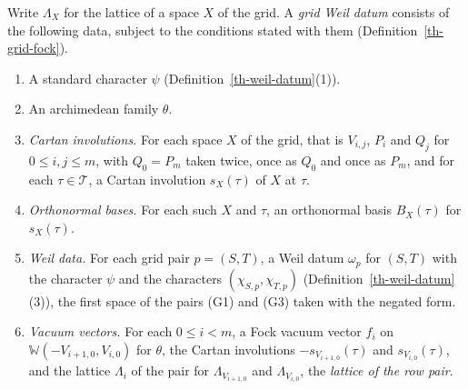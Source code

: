 \begin{definition}
Write $\Lambda_X$ for the lattice of a space $X$ of the grid. A \emph{grid Weil
datum} consists of the following data, subject to the conditions stated with
them (Definition~\ref{th-grid-fock}).
\begin{enumerate}
\item[(W1)] A standard character $\psi$ (Definition~\ref{th-weil-datum}(1)).
\item[(W2)] An archimedean family $\theta$.
\item[(W3)] \emph{Cartan involutions.} For each space $X$ of the grid, that is
  $V_{i,j}$, $P_i$ and $Q_j$ for $0\leq i,j\leq m$, with $Q_0=P_m$ taken twice,
  once as $Q_0$ and once as $P_m$, and for each $\tau\in\mathcal T$, a Cartan
  involution $s_X(\tau)$ of $X$ at $\tau$.
\item[(W4)] \emph{Orthonormal bases.} For each such $X$ and $\tau$, an
  orthonormal basis $B_X(\tau)$ for $s_X(\tau)$.
\item[(W5)] \emph{Weil data.} For each grid pair $p=(S,T)$, a Weil datum
  $\omega_p$ for $(S,T)$ with the character $\psi$ and the characters
  $(\chi_{S,p},\chi_{T,p})$ (Definition~\ref{th-weil-datum}(3)), the first space
  of the pairs (G1) and (G3) taken with the negated form.
\item[(W6)] \emph{Vacuum vectors.} For each $0\leq i<m$, a Fock vacuum vector
  $f_i$ on $\mathbb W(-V_{i+1,0},V_{i,0})$ for $\theta$, the Cartan involutions
  $-s_{V_{i+1,0}}(\tau)$ and $s_{V_{i,0}}(\tau)$, and the lattice $\Lambda_i$ of
  the pair for $\Lambda_{V_{i+1,0}}$ and $\Lambda_{V_{i,0}}$, the \emph{lattice
  of the row pair}.

\end{enumerate}
\end{definition}
